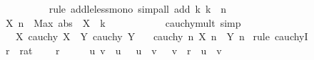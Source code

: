\begin{isabellebody}
\ \ \ \ \ \ \ \ \isamarkupfalse%
\ {\isacharparenleft}{\kern0pt}rule\ add{\isacharunderscore}{\kern0pt}le{\isacharunderscore}{\kern0pt}less{\isacharunderscore}{\kern0pt}mono{\isacharparenright}{\kern0pt}\ {\isacharparenleft}{\kern0pt}simp{\isacharunderscore}{\kern0pt}all\ add{\isacharcolon}{\kern0pt}\ k\ {\isacartoucheopen}k\ {\isasymle}\ n{\isacartoucheclose}{\isacharparenright}{\kern0pt}\isanewline
\ \ \ \ \ \ \isamarkupfalse%
\ \isamarkupfalse%
\ {\isachardoublequoteopen}{\isasymbar}X\ n{\isasymbar}\ {\isacharless}{\kern0pt}\ Max\ {\isacharparenleft}{\kern0pt}abs\ {\isacharbackquote}{\kern0pt}\ X\ {\isacharbackquote}{\kern0pt}\ {\isacharbraceleft}{\kern0pt}{\isachardot}{\kern0pt}{\isachardot}{\kern0pt}k{\isacharbraceright}{\kern0pt}{\isacharparenright}{\kern0pt}\ {\isacharplus}{\kern0pt}\ {}{\isachardoublequoteclose}\ \isacommand{{\isachardot}{\kern0pt}}\isamarkupfalse%
\isanewline
\ \ \ \ \isamarkupfalse%
\isanewline
\ \ \isamarkupfalse%
\isanewline
{}\isamarkupfalse%
%
\endisatagproof
{\isafoldproof}%
%
\isadelimproof
\isanewline
%
\endisadelimproof
\isanewline
{}\isamarkupfalse%
\ cauchy{\isacharunderscore}{\kern0pt}mult\ {\isacharbrackleft}{\kern0pt}simp{\isacharbrackright}{\kern0pt}{\isacharcolon}{\kern0pt}\isanewline
\ \ \ X{\isacharcolon}{\kern0pt}\ {\isachardoublequoteopen}cauchy\ X{\isachardoublequoteclose}\ \ Y{\isacharcolon}{\kern0pt}\ {\isachardoublequoteopen}cauchy\ Y{\isachardoublequoteclose}\isanewline
\ \ \ {\isachardoublequoteopen}cauchy\ {\isacharparenleft}{\kern0pt}{\isasymlambda}n{\isachardot}{\kern0pt}\ X\ n\ {\isacharasterisk}{\kern0pt}\ Y\ n{\isacharparenright}{\kern0pt}{\isachardoublequoteclose}\isanewline
%
\isadelimproof
%
\endisadelimproof
%
\isatagproof
{}\isamarkupfalse%
\ {\isacharparenleft}{\kern0pt}rule\ cauchyI{\isacharparenright}{\kern0pt}\isanewline
\ \ \isamarkupfalse%
\ r\ {\isacharcolon}{\kern0pt}{\isacharcolon}{\kern0pt}\ rat\ \isamarkupfalse%
\ {\isachardoublequoteopen}{}\ {\isacharless}{\kern0pt}\ r{\isachardoublequoteclose}\isanewline
\ \ \isamarkupfalse%
\ \isamarkupfalse%
\ u\ v\ \ u{\isacharcolon}{\kern0pt}\ {\isachardoublequoteopen}{}\ {\isacharless}{\kern0pt}\ u{\isachardoublequoteclose}\ \ v{\isacharcolon}{\kern0pt}\ {\isachardoublequoteopen}{}\ {\isacharless}{\kern0pt}\ v{\isachardoublequoteclose}\ \ {\isachardoublequoteopen}r\ {\isacharequal}{\kern0pt}\ u\ {\isacharplus}{\kern0pt}\ v{\isachardoublequoteclose}\isanewline

\end{isabellebody}

